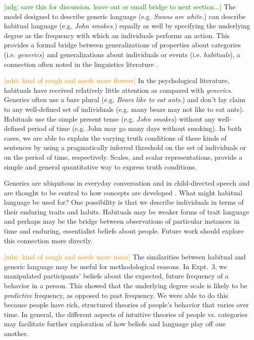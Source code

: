 \documentclass[10pt,letterpaper]{article}
\newcommand{\ndg}[1]{\textcolor{Green}{[ndg: #1]}}
\newcommand{\mht}[1]{\textcolor{DarkOrange}{[mht: #1]}}
\begin{document}
\ndg{save this for discussion. leave out or small bridge to next section...}
The model designed to describe generic language (e.g. \emph{Swans are white.}) can describe habitual language (e.g. \emph{John smokes.}) equally as well by specifying the underlying degree as the frequency with which an individuals performs an action.
This provides a formal bridge between generalizations of properties about categories (i.e. \emph{generics}) and generalizations about individuals or events (i.e. \emph{habituals}), a connection often noted in the linguistics literature \cite{Carlson1977, Carlson2005, Cohen1999}. 



\mht{kind of rough and needs more flowers}
In the psychological literature, habituals have received relatively little attention as compared with \emph{generics}. 
Generics often use a bare plural (e.g. \emph{Bears like to eat ants.}) and don't lay claim to any well-defined set of individuals (e.g. many bears may not like to eat ants).
Habituals use the simple present tense (e.g. \emph{John smokes}) without any well-defined period of time (e.g. John may go many days without smoking). 
In both cases, we are able to explain the varying truth conditions of these kinds of sentences by using a pragmatically inferred threshold on the set of individuals or on the period of time, respectively. 
Scales, and scalar representations, provide a simple and general quantitative way to express truth conditions.

Generics are ubiquitous in everyday conversation and in child-directed speech \cite{Gelman2008} and are thought to be central to how concepts are developed \cite{Gelman2004}.
What might habitual language be used for?
One possibility is that we describe individuals in terms of their enduring traits and habits. 
Habituals may be weaker forms of trait language \cite{Gelman1999} and perhaps may be the bridge between observations of particular instances in time and enduring, essentialist beliefs about people.
Future work should explore this connection more directly.
	
\mht{kind of rough and needs more meat}
The similarities between habitual and generic language may be useful for methodological reasons. 
In Expt.~3, we manipulated participants' beliefs about the expected, future frequency of a behavior in a person.
This showed that the underlying degree scale is likely to be \emph{predictive} frequency, as opposed to past frequency. 
We were able to do this because people have rich, structured theories of people's behavior that varies over time. 
In general, the different aspects of intuitive theories of people vs. categories may facilitate further exploration of how beliefs and language play off one another.
\end{document}
